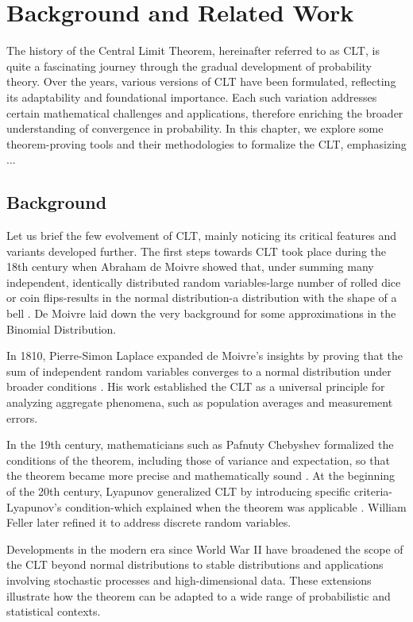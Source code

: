 \chapter{Background and Related Work}
\label{background}

The history of the Central Limit Theorem, hereinafter referred to as CLT, is quite a fascinating journey through the gradual development of probability theory. Over the years, various versions of CLT have been formulated, reflecting its adaptability and foundational importance. Each such variation addresses certain mathematical challenges and applications, therefore enriching the broader understanding of convergence in probability. In this chapter, we explore some theorem-proving tools and their methodologies to formalize the CLT, emphasizing ...

\section{Background}
Let us brief the few evolvement of CLT, mainly noticing its critical features and variants developed further. The first steps towards CLT took place during the 18th century when Abraham de Moivre showed that, under summing many independent, identically distributed random variables-large number of rolled dice or coin flips-results in the normal distribution-a distribution with the shape of a bell \cite{de1733approximatio}. De Moivre laid down the very background for some approximations in the Binomial Distribution.

In 1810, Pierre-Simon Laplace expanded de Moivre’s insights by proving that the sum of independent random variables converges to a normal distribution under broader conditions \cite{laplace1835oeuvres}. His work established the CLT as a universal principle for analyzing aggregate phenomena, such as population averages and measurement errors.

In the 19th century, mathematicians such as Pafnuty Chebyshev formalized the conditions of the theorem, including those of variance and expectation, so that the theorem became more precise and mathematically sound \cite{chebyshev1890deux}. At the beginning of the 20th century, Lyapunov generalized CLT by introducing specific criteria-Lyapunov's condition-which explained when the theorem was applicable \cite{lyapunov1895pafnutii}. William Feller \cite{feller1945} later refined it to address discrete random variables.

Developments in the modern era since World War II have broadened the scope of the CLT beyond normal distributions to stable distributions and applications involving stochastic processes and high-dimensional data. These extensions illustrate how the theorem can be adapted to a wide range of probabilistic and statistical contexts.

